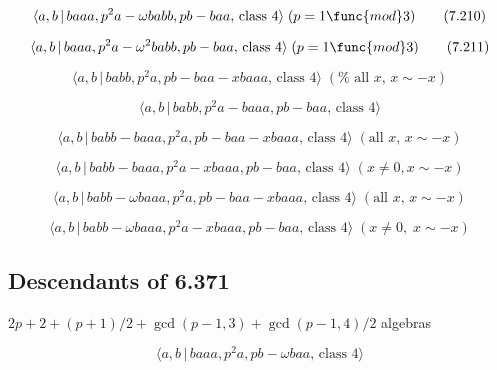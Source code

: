 \documentclass[10pt]{article}
\begin{document}
\begin{equation}
\langle a,b\,|\,baaa,p^{2}a-\omega babb,pb-baa,\,\text{class }4\rangle \;(p=1%
\func{mod}3)  \tag{7.210}
\end{equation}

\begin{equation}
\langle a,b\,|\,baaa,p^{2}a-\omega ^{2}babb,pb-baa,\,\text{class }4\rangle
\;(p=1\func{mod}3)  \tag{7.211}
\end{equation}

\begin{equation}
\langle a,b\,|\,babb,p^{2}a,pb-baa-xbaaa,\,\text{class }4\rangle \;(\text{%
all }x,\,x\sim -x)  \tag{7.212}
\end{equation}

\begin{equation}
\langle a,b\,|\,babb,p^2a-baaa,pb-baa,\,\text{class }4\rangle  \tag{7.213}
\end{equation}

\begin{equation}
\langle a,b\,|\,babb-baaa,p^{2}a,pb-baa-xbaaa,\,\text{class }4\rangle \;(%
\text{all }x,\,x\sim -x)  \tag{7.214}
\end{equation}

\begin{equation}
\langle a,b\,|\,babb-baaa,p^2a-xbaaa,pb-baa,\,\text{class }4\rangle \;(x
\neq 0, x \sim -x)  \tag{7.215}
\end{equation}

\begin{equation}
\langle a,b\,|\,babb-\omega baaa,p^{2}a,pb-baa-xbaaa,\,\text{class }4\rangle
\;(\text{all }x,\,x\sim -x)  \tag{7.216}
\end{equation}

\begin{equation}
\langle a,b\,|\,babb-\omega baaa,p^{2}a-xbaaa,pb-baa,\,\text{class }4\rangle
\;(x\neq 0,\;x\sim -x)  \tag{7.217}
\end{equation}

\subsection{Descendants of 6.371}

$2p+2+(p+1)/2+\gcd (p-1,3)+\gcd (p-1,4)/2$ algebras

\begin{equation}
\langle a,b\,|\,baaa,p^{2}a,pb-\omega baa,\,\text{class }4\rangle 
\tag{7.218}
\end{equation}
\end{document}
